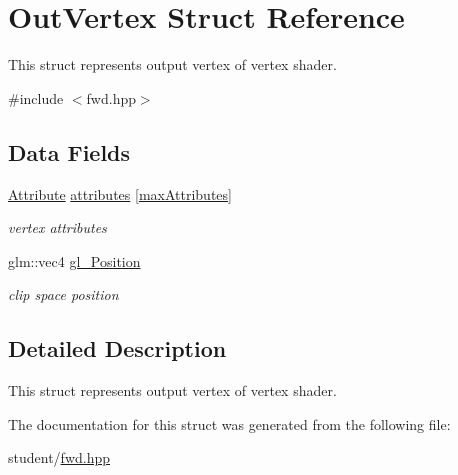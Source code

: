 \hypertarget{structOutVertex}{}\section{Out\+Vertex Struct Reference}
\label{structOutVertex}


This struct represents output vertex of vertex shader.  




{\ttfamily \#include $<$fwd.\+hpp$>$}

\subsection*{Data Fields}
\begin{DoxyCompactItemize}
\item 
\mbox{\label{structOutVertex_ad1d48203a36e3ee510841f25a5bc068e}} 
\hyperlink{unionAttribute}{Attribute} \hyperlink{structOutVertex_ad1d48203a36e3ee510841f25a5bc068e}{attributes} \mbox{[}\hyperlink{fwd_8hpp_a176b31bcc8f8b93ee7ef0810ea77730b}{max\+Attributes}\mbox{]}
\begin{DoxyCompactList}\small\item\em vertex attributes \end{DoxyCompactList}\item 
\mbox{\label{structOutVertex_a9ca7de8eef8d688163497a7d34c76d7b}} 
glm\+::vec4 \hyperlink{structOutVertex_a9ca7de8eef8d688163497a7d34c76d7b}{gl\+\_\+\+Position}
\begin{DoxyCompactList}\small\item\em clip space position \end{DoxyCompactList}\end{DoxyCompactItemize}


\subsection{Detailed Description}
This struct represents output vertex of vertex shader. 

The documentation for this struct was generated from the following file\+:\begin{DoxyCompactItemize}
\item 
student/\hyperlink{fwd_8hpp}{fwd.\+hpp}\end{DoxyCompactItemize}
